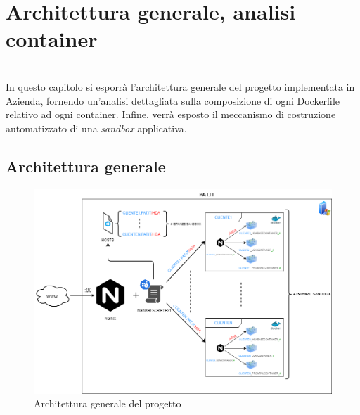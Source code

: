 
\chapter{Architettura generale, analisi container}
\label{cap:architettura-progetto-container}

\\
In questo capitolo si esporrà l'architettura generale del progetto implementata in Azienda, fornendo un'analisi dettagliata sulla composizione di ogni Dockerfile relativo ad ogni container. Infine, verrà esposto il meccanismo di costruzione automatizzato di una \textit{sandbox} applicativa.

\section{Architettura generale}
\begin{figure}[!h]     
\centering 
    \includegraphics[width=1.0\columnwidth]{immagini/img/hda_containerized_architecture} 
    \caption{Architettura generale del progetto}
\end{figure} 

